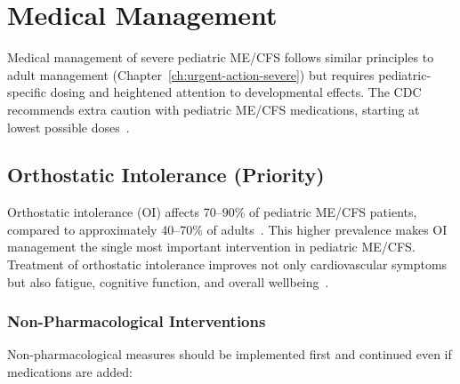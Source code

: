 \section{Medical Management}
\label{sec:ped-severe-medical}

Medical management of severe pediatric ME/CFS follows similar principles to adult management (Chapter~\ref{ch:urgent-action-severe}) but requires pediatric-specific dosing and heightened attention to developmental effects. The CDC recommends extra caution with pediatric ME/CFS medications, starting at lowest possible doses~\cite{CDC2024pediatric}.

\subsection{Orthostatic Intolerance (Priority)}
\label{subsec:ped-severe-oi}

Orthostatic intolerance (OI) affects 70--90\% of pediatric ME/CFS patients, compared to approximately 40--70\% of adults~\cite{Rowe2017pediatric}. This higher prevalence makes OI management the single most important intervention in pediatric ME/CFS. Treatment of orthostatic intolerance improves not only cardiovascular symptoms but also fatigue, cognitive function, and overall wellbeing~\cite{Ojha2024pediatricPOTS}.

\subsubsection{Non-Pharmacological Interventions}

Non-pharmacological measures should be implemented first and continued even if medications are added:

